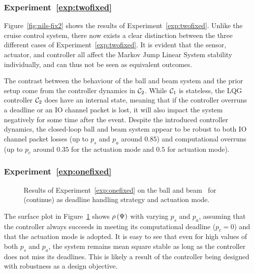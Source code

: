 \subsubsection*{Experiment~\ref{exp:twofixed}}%
%
Figure~\ref{fig:nils-fix2} shows the results of Experiment~\ref{exp:twofixed}.
Unlike the cruise control system, there now exists a clear distinction between the three different cases of Experiment~\ref{exp:twofixed}.
It is evident that the sensor, actuator, and controller all affect the Markov Jump Linear System stability individually, and can thus not be seen as equivalent outcomes.

The contrast between the behaviour of the ball and beam system and the prior setup come from the controller dynamics in $\mathcal{C}_2$.
While $\mathcal{C}_1$ is stateless, the LQG controller $\mathcal{C}_2$ does have an internal state, meaning that if the controller overruns a deadline or an IO channel packet is lost, it will also impact the system negatively for some time after the event.
Despite the introduced controller dynamics, the closed-loop ball and beam system appear to be robust to both IO channel packet losses (up to $p_s$ and $p_a$ around $0.85$) and computational overruns (up to $p_c$ around $0.35$ for the \tZ{} actuation mode and $0.5$ for \tH{} actuation mode).

\subsubsection*{Experiment~\ref{exp:onefixed}}%
%
\begin{figure}[t]
    \centering
    \caption{Results of Experiment~\ref{exp:onefixed} on the ball and beam~\cite{Vreman:2022} for (continue) \tKZ{} as deadline handling strategy and actuation mode.}
    \label{fig:nils-kz-sa}
\end{figure}
%
The surface plot in Figure~\ref{fig:nils-kz-sa} shows $\rho\left( \Psi \right)$ with varying $p_s$ and $p_a$, assuming that the controller always succeeds in meeting its computational deadline ($p_c=0$) and that the \tZ{} actuation mode is adopted.
It is easy to see that even for high values of both $p_s$ and $p_a$, the system remains mean square stable as long as the controller does not miss its deadlines.
This is likely a result of the controller being designed with robustness as a design objective.

